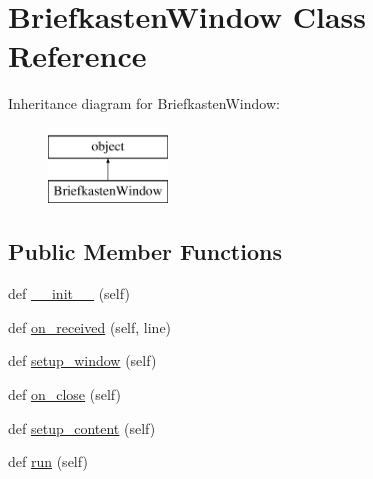\hypertarget{class_g_u_i_01_briefkasten_1_1_briefkasten_window}{}\section{Briefkasten\+Window Class Reference}
\label{class_g_u_i_01_briefkasten_1_1_briefkasten_window}
Inheritance diagram for Briefkasten\+Window\+:\begin{figure}[H]
\begin{center}
\leavevmode
\includegraphics[height=2.000000cm]{class_g_u_i_01_briefkasten_1_1_briefkasten_window}
\end{center}
\end{figure}
\subsection*{Public Member Functions}
\begin{DoxyCompactItemize}
\item 
def \mbox{\hyperlink{class_g_u_i_01_briefkasten_1_1_briefkasten_window_ae64f0875afe3067b97ba370b354b9213}{\+\_\+\+\_\+init\+\_\+\+\_\+}} (self)
\item 
def \mbox{\hyperlink{class_g_u_i_01_briefkasten_1_1_briefkasten_window_ae427a00dd476d2fb2706445a342d9845}{on\+\_\+received}} (self, line)
\item 
def \mbox{\hyperlink{class_g_u_i_01_briefkasten_1_1_briefkasten_window_a9fe79fb8dbee1e660dc971b137c55f3f}{setup\+\_\+window}} (self)
\item 
def \mbox{\hyperlink{class_g_u_i_01_briefkasten_1_1_briefkasten_window_a7e20a417210b832ce9e307ce5dc0f2a8}{on\+\_\+close}} (self)
\item 
def \mbox{\hyperlink{class_g_u_i_01_briefkasten_1_1_briefkasten_window_ab6e6fe2e785e29f0597e4fcdd3ec9063}{setup\+\_\+content}} (self)
\item 
def \mbox{\hyperlink{class_g_u_i_01_briefkasten_1_1_briefkasten_window_ad22709b2e67308af35f55680d5a026e0}{run}} (self)
\end{DoxyCompactItemize}
